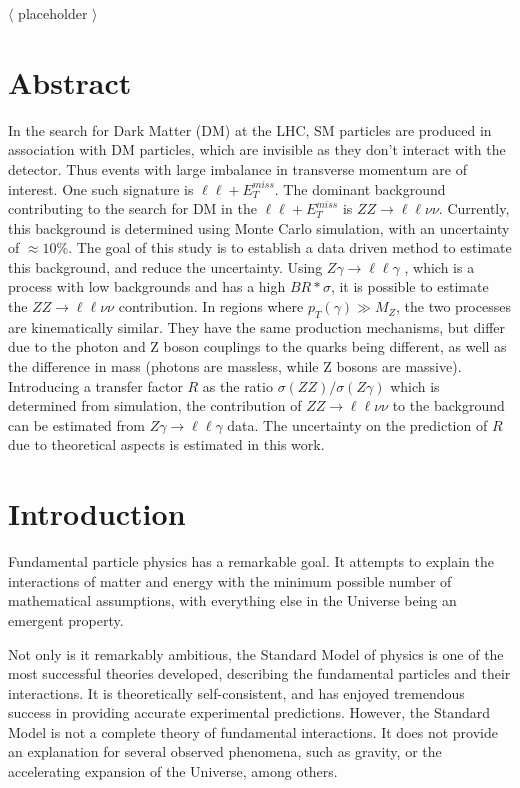 \documentclass[12pt,a4paper,openright,twoside]{report}
\newcommand{\ZZ}{$ZZ\to \ell\ell\nu\nu$ }
\newcommand{\Zg}{$Z\gamma\to \ell\ell\gamma$ }
\newcommand\blankpage{%
    \null
    \thispagestyle{empty}%
    \addtocounter{page}{-1}%
    \newpage}
\begin{document}
$\langle$ placeholder $\rangle$

\newpage
\blankpage
\newpage

\chapter*{Abstract}
\setcounter{page}{1}
In the search for Dark Matter (DM) at the LHC, SM particles are produced in association with DM particles, which are invisible as they don't interact with the detector. Thus events with large imbalance in transverse momentum are of interest. One such signature is $\ell\ell + E_T^{miss}$. The dominant background contributing to the search for DM in the $\ell\ell + E_T^{miss}$ is $ZZ \rightarrow \ell\ell\nu\nu$.  Currently, this background is determined using Monte Carlo simulation, with an uncertainty of $\approx 10\%$. The goal of this study is to establish a data driven method to estimate this background, and reduce the uncertainty. Using \Zg, which is a process with low backgrounds and has a high $BR*\sigma$, it is possible to estimate the \ZZ contribution. In regions where $p_{T}(\gamma) \gg M_{Z}$, the two processes are kinematically similar. They have the same production mechanisms, but differ due to the photon and Z boson couplings to the quarks being different, as well as the difference in mass (photons are massless, while Z bosons are massive). Introducing a transfer factor $R$ as the ratio $\sigma(ZZ)/\sigma(Z\gamma)$ which is determined from simulation, the contribution of \ZZ to the background can be estimated from \Zg data. The uncertainty on the prediction of $R$ due to theoretical aspects is estimated in this work.
\thispagestyle{plain}
\tableofcontents
\thispagestyle{empty}
\cleardoublepage
{}
\chapter{Introduction}
\pagestyle{plain}
\setcounter{page}{1}
Fundamental particle physics has a remarkable goal. It attempts to explain the interactions of matter and energy with the minimum possible number of mathematical assumptions, with everything else in the Universe being an emergent property.

Not only is it remarkably ambitious, the Standard Model of physics is one of the most successful theories developed, describing the fundamental particles and their interactions\cite{griff}. It is theoretically self-consistent, and has enjoyed tremendous success in providing accurate experimental predictions. However, the Standard Model is not a complete theory of fundamental interactions. It does not provide an explanation for several observed phenomena, such as gravity, or the accelerating expansion of the Universe, among others.
\end{document}
